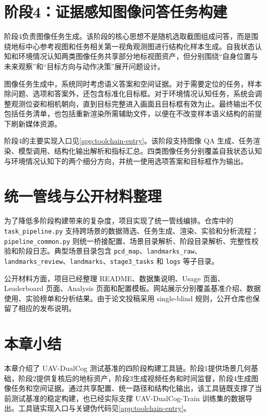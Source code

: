 \section{阶段4：证据感知图像问答任务构建}

阶段4负责图像任务生成。该阶段的核心思想不是随机选取截图组成问答，而是围绕地标中心参考视图和任务相关第一视角观测图进行结构化样本生成。自我状态认知和环境情况认知两类图像任务共享部分地标视图资产，但分别围绕“自身位置与未来观察”和“目标方向与动作决策”展开问题设计。

图像任务生成中，系统同时考虑语义答案和空间证据。对于需要定位的任务，样本除问题、选项和答案外，还包含标准化目标框。对于环境情况认知任务，系统会调整观测位姿和相机朝向，直到目标完整进入画面且目标框有效为止。最终输出不仅包括任务清单，也包括重新渲染所需辅助文件，以便在不改变样本语义结构的前提下刷新媒体资源。

阶段4的主要实现入口见\autoref{app:toolchain-entry}。该阶段支持图像 QA 生成、任务渲染、模型调用、结构化输出解析和指标汇总。四类图像任务分别覆盖自我状态认知与环境情况认知下的两个细分方向，并统一使用选项答案和目标框作为输出。

\section{统一管线与公开材料整理}

为了降低多阶段构建带来的复杂度，项目实现了统一管线编排。仓库中的 \texttt{task\_pipeline.py} 支持跨场景的数据筛选、任务生成、渲染、实验和分析流程；\texttt{pipeline\_common.py} 则统一桥接配置、场景目录解析、阶段目录解析、完整性校验和阶段日志。典型场景目录包含 \texttt{pcd\_map}、\texttt{landmarks\_raw}、\texttt{landmarks\_review}、\texttt{landmarks}、\texttt{stage3\_tasks} 和 \texttt{logs} 等子目录。

公开材料方面，项目已经整理 README、数据集说明、Usage 页面、Leaderboard 页面、Analysis 页面和配置模板。网站展示分别覆盖基准介绍、数据使用、实验榜单和分析结果。由于论文投稿采用 single-blind 规则，公开仓库也保留了相应的发布说明。

\section{本章小结}

本章介绍了 UAV-DualCog 测试基准的四阶段构建工具链。阶段1提供场景几何基础，阶段2提供复核后的地标资产，阶段3生成视频任务和时间监督，阶段4生成图像任务和空间证据。通过共享配置、统一路径和结构化输出，该工具链既支撑了当前测试基准的稳定构建，也已经实际支撑 UAV-DualCog-Train 训练集的数据导出。工具链实现入口与关键伪代码见\autoref{app:toolchain-entry}。
